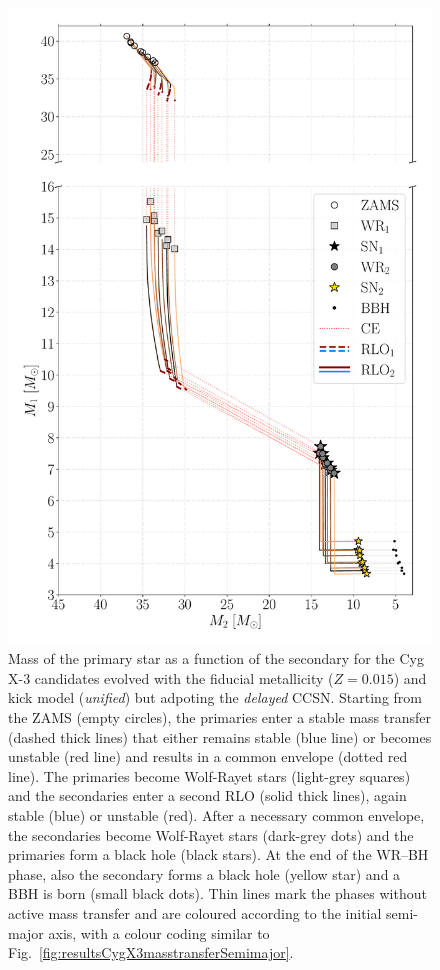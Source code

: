 \documentclass[a4paper,titlepage]{book}     	%
\begin{document}
\begin{appendices}
\begin{figure}
	\centering
	\includegraphics[width=.9\textwidth]{./images/del_Mass_1_Mass_0_BHBH_GW_WRBH_cyg_x-3--Ko17.pdf}
	\caption{Mass of the primary star as a function of the secondary for the Cyg X-3 candidates evolved with the fiducial metallicity ($Z=0.015$) and kick model (\emph{unified}) but adpoting the \emph{delayed} CCSN. Starting from the ZAMS (empty circles), the primaries enter a stable mass transfer (dashed thick lines) that either remains stable (blue line) or becomes unstable (red line) and results in a common envelope (dotted red line). The primaries become Wolf-Rayet stars (light-grey squares) and the secondaries enter a second RLO (solid thick lines), again stable (blue) or unstable (red). After a necessary common envelope, the secondaries become Wolf-Rayet stars (dark-grey dots) and the primaries form a black hole (black stars). At the end of the WR--BH phase, also the secondary forms a black hole (yellow star) and a BBH is born (small black dots). Thin lines mark the phases without active mass transfer and are coloured according to the initial semi-major axis, with a colour coding similar to Fig.\ \ref{fig:resultsCygX3masstransferSemimajor}.}\label{fig:resultsCygX3masstransferM1M2delayed}
\end{figure}









\end{appendices}
\end{document}
